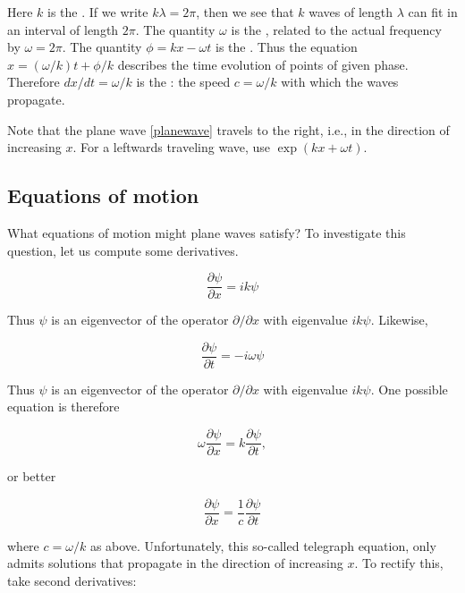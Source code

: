 Here $k$ is the .  If we write $k\lambda= 2\pi$, then we see that $k$ waves of length $\lambda$ can fit in an interval of length $2\pi$.
The quantity $\omega$ is the , related to the actual frequency by $\omega = 2\pi$.  The quantity $\phi = kx - \omega t$  is the .   Thus the equation $x = (\omega/k)t + \phi/k$ describes the time evolution of points of given phase.  Therefore $dx/dt = \omega/k$ is the : the speed $c = \omega/k$ with which the waves propagate.

Note that the plane wave \eqref{planewave}  travels to the right, i.e., in the direction of increasing $x$.  For a leftwards traveling wave, use $\exp(kx + \omega t)$.

\subsection{Equations of motion}

What equations of motion might plane waves satisfy?  To investigate this question, let us compute some derivatives.


\begin{equation}
\label{psix}
\frac{\partial\psi}{\partial x} = ik\psi
\end{equation}

Thus $\psi$ is an eigenvector of the operator $\partial/\partial x$ with eigenvalue $ik\psi$.  Likewise,



\begin{equation}
\frac{\partial\psi}{\partial t} = -i\omega\psi
\end{equation}

Thus $\psi$ is an eigenvector of the operator $\partial/\partial x$ with eigenvalue $ik\psi$. One possible equation is therefore

\begin{equation}
\omega \frac{\partial\psi}{\partial x} = k \frac{\partial\psi}{\partial t} ,
\end{equation}

or better

\begin{equation}
\frac{\partial\psi}{\partial x} = \frac{1}{c} \frac{\partial\psi}{\partial t}
\end{equation}

where $c = \omega/k$ as above.  Unfortunately, this so-called telegraph equation, only admits solutions that propagate in the direction of increasing $x$.  To rectify this, take second derivatives:

